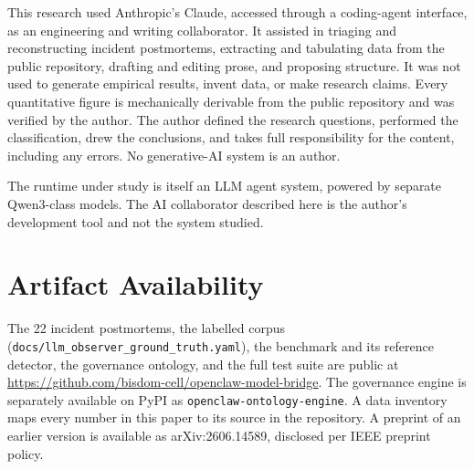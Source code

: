 \documentclass[conference]{IEEEtran}
\begin{document}
This research used Anthropic's Claude, accessed through a coding-agent
interface, as an engineering and writing collaborator. It assisted in
triaging and reconstructing incident postmortems, extracting and tabulating
data from the public repository, drafting and editing prose, and proposing
structure. It was not used to generate empirical results, invent data, or
make research claims. Every quantitative figure is mechanically derivable
from the public repository and was verified by the author. The author
defined the research questions, performed the classification, drew the
conclusions, and takes full responsibility for the content, including any
errors. No generative-AI system is an author.

The runtime under study is itself an LLM agent system, powered by separate
Qwen3-class models. The AI collaborator described here is the author's
development tool and not the system studied.

\section*{Artifact Availability}

The 22 incident postmortems, the labelled corpus
(\texttt{docs/llm\_observer\_ground\_truth.yaml}), the benchmark and its
reference detector, the governance ontology, and the full test suite are
public at \url{https://github.com/bisdom-cell/openclaw-model-bridge}. The
governance engine is separately available on PyPI as
\texttt{openclaw-ontology-engine}. A data inventory maps every number in
this paper to its source in the repository. A preprint of an earlier version
is available as arXiv:2606.14589, disclosed per IEEE preprint policy.
\end{document}
